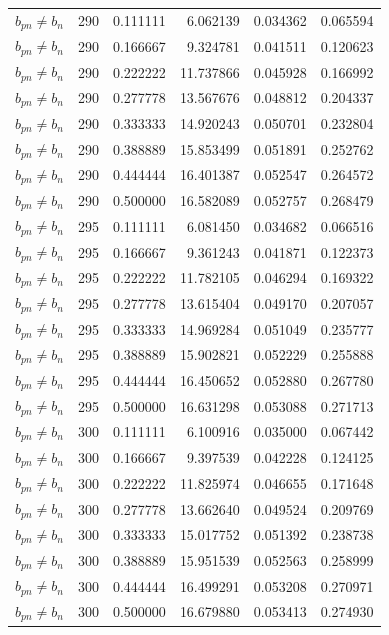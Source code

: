 \begin{longtable}{l r r r r r}
$b_{pn} \neq b_n$ & 290 & 0.111111 & 6.062139 & 0.034362 & 0.065594 \\
$b_{pn} \neq b_n$ & 290 & 0.166667 & 9.324781 & 0.041511 & 0.120623 \\
$b_{pn} \neq b_n$ & 290 & 0.222222 & 11.737866 & 0.045928 & 0.166992 \\
$b_{pn} \neq b_n$ & 290 & 0.277778 & 13.567676 & 0.048812 & 0.204337 \\
$b_{pn} \neq b_n$ & 290 & 0.333333 & 14.920243 & 0.050701 & 0.232804 \\
$b_{pn} \neq b_n$ & 290 & 0.388889 & 15.853499 & 0.051891 & 0.252762 \\
$b_{pn} \neq b_n$ & 290 & 0.444444 & 16.401387 & 0.052547 & 0.264572 \\
$b_{pn} \neq b_n$ & 290 & 0.500000 & 16.582089 & 0.052757 & 0.268479 \\
$b_{pn} \neq b_n$ & 295 & 0.111111 & 6.081450 & 0.034682 & 0.066516 \\
$b_{pn} \neq b_n$ & 295 & 0.166667 & 9.361243 & 0.041871 & 0.122373 \\
$b_{pn} \neq b_n$ & 295 & 0.222222 & 11.782105 & 0.046294 & 0.169322 \\
$b_{pn} \neq b_n$ & 295 & 0.277778 & 13.615404 & 0.049170 & 0.207057 \\
$b_{pn} \neq b_n$ & 295 & 0.333333 & 14.969284 & 0.051049 & 0.235777 \\
$b_{pn} \neq b_n$ & 295 & 0.388889 & 15.902821 & 0.052229 & 0.255888 \\
$b_{pn} \neq b_n$ & 295 & 0.444444 & 16.450652 & 0.052880 & 0.267780 \\
$b_{pn} \neq b_n$ & 295 & 0.500000 & 16.631298 & 0.053088 & 0.271713 \\
$b_{pn} \neq b_n$ & 300 & 0.111111 & 6.100916 & 0.035000 & 0.067442 \\
$b_{pn} \neq b_n$ & 300 & 0.166667 & 9.397539 & 0.042228 & 0.124125 \\
$b_{pn} \neq b_n$ & 300 & 0.222222 & 11.825974 & 0.046655 & 0.171648 \\
$b_{pn} \neq b_n$ & 300 & 0.277778 & 13.662640 & 0.049524 & 0.209769 \\
$b_{pn} \neq b_n$ & 300 & 0.333333 & 15.017752 & 0.051392 & 0.238738 \\
$b_{pn} \neq b_n$ & 300 & 0.388889 & 15.951539 & 0.052563 & 0.258999 \\
$b_{pn} \neq b_n$ & 300 & 0.444444 & 16.499291 & 0.053208 & 0.270971 \\
$b_{pn} \neq b_n$ & 300 & 0.500000 & 16.679880 & 0.053413 & 0.274930 \\

\end{longtable}

